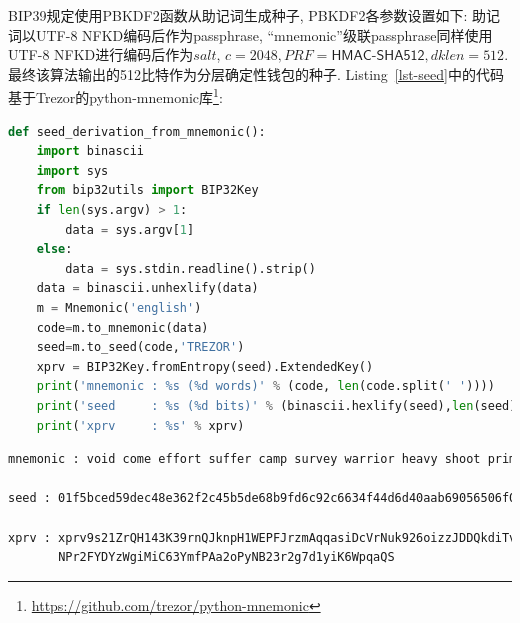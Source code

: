 
BIP39规定使用\textsf{PBKDF2}函数从助记词生成种子, \textsf{PBKDF2}各参数设置如下:
助记词以UTF-8 NFKD编码后作为passphrase,
“mnemonic”级联passphrase同样使用UTF-8 NFKD进行编码后作为$salt$,
$c=2048, PRF=\textsf{HMAC-SHA512}, dklen=512$.
最终该算法输出的512比特作为分层确定性钱包的种子.
Listing~\ref{lst-seed}中的代码基于Trezor的python-mnemonic库\footnote{\url{https://github.com/trezor/python-mnemonic}}:

\begin{lstlisting}[language=python, caption=基于助记词句子的种子派生, label=lst-seed]
def seed_derivation_from_mnemonic():
    import binascii
    import sys
    from bip32utils import BIP32Key
    if len(sys.argv) > 1:
        data = sys.argv[1]
    else:
        data = sys.stdin.readline().strip()
    data = binascii.unhexlify(data)
    m = Mnemonic('english')
    code=m.to_mnemonic(data)
    seed=m.to_seed(code,'TREZOR')
    xprv = BIP32Key.fromEntropy(seed).ExtendedKey()
    print('mnemonic : %s (%d words)' % (code, len(code.split(' '))))
    print('seed     : %s (%d bits)' % (binascii.hexlify(seed),len(seed) * 4))
    print('xprv     : %s' % xprv)
\end{lstlisting}

\begin{lstlisting}[language=bash, caption = Listing~\ref{lst-seed}~的执行结果示例]
mnemonic : void come effort suffer camp survey warrior heavy shoot primary clutch crush open amazing screen patrol group space point ten exist slush involve unfold (24 words) 

seed : 01f5bced59dec48e362f2c45b5de68b9fd6c92c6634f44d6d40aab69056506f0e35524a    518034ddc1192e1dacd32c1ed3eaa3c3b131c88ed8e7e54c49a5d0998 (256 bits) 

xprv : xprv9s21ZrQH143K39rnQJknpH1WEPFJrzmAqqasiDcVrNuk926oizzJDDQkdiTv
       NPr2FYDYzWgiMiC63YmfPAa2oPyNB23r2g7d1yiK6WpqaQS
\end{lstlisting}